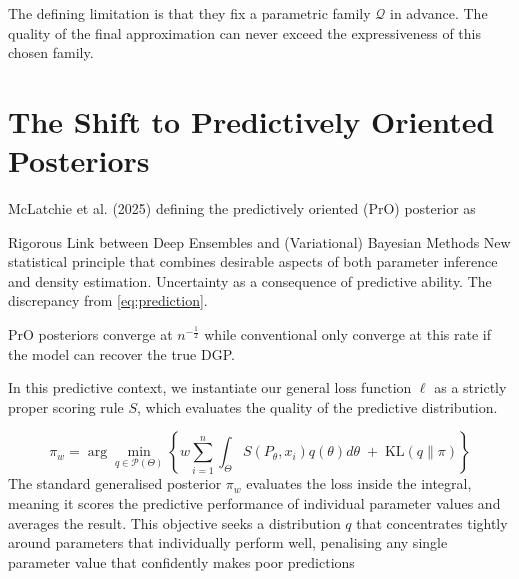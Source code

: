 \documentclass[11pt,a4paper]{article}
\begin{document}
The defining limitation is that they fix a parametric family $\mathcal{Q}$ in advance.
The quality of the final approximation can never exceed the expressiveness of this chosen family.

\section{The Shift to Predictively Oriented Posteriors}
McLatchie et al. (2025) defining the predictively oriented (PrO)
posterior as


Rigorous Link between Deep Ensembles and (Variational) Bayesian Methods
New statistical principle that combines desirable aspects of both parameter inference and density estimation. Uncertainty as a consequence of predictive ability. The discrepancy from \eqref{eq:prediction}.

PrO posteriors converge at $n^{-\frac{1}{2}}$ while conventional only converge at this rate if the model can recover the true DGP.

In this predictive context, we instantiate our general loss function $\ell$ as a strictly proper scoring rule $S$, which evaluates the quality of the predictive distribution.


$$\pi_{w} = \arg\min_{q\in\mathcal{P}(\Theta)}\left\{ w\sum_{i=1}^{n} \int_\Theta S(P_\theta, x_i)q(\theta)d\theta \;+\; \mathrm{KL}(q\|\pi) \right\}$$
The standard generalised posterior $\pi_w$ evaluates the loss inside the integral, meaning it scores the predictive performance of individual parameter values and averages the result. This objective seeks a distribution $q$ that concentrates tightly around parameters that individually perform well, penalising any single parameter value that confidently makes poor predictions
\end{document}
